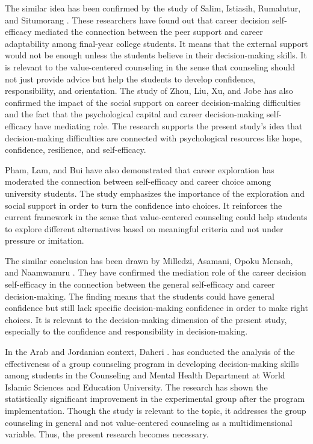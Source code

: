 \documentclass[10pt]{NSP1}
\begin{document}
The similar idea has been confirmed by the study of Salim, Istiasih, Rumalutur, and Situmorang \cite{ref30} . These researchers have found out that career decision self-efficacy mediated the connection between the peer support and career adaptability among final-year college students. It means that the external support would not be enough unless the students believe in their decision-making skills. It is relevant to the value-centered counseling in the sense that counseling should not just provide advice but help the students to develop confidence, responsibility, and orientation. The study of Zhou, Liu, Xu, and Jobe \cite{ref31} has also confirmed the impact of the social support on career decision-making difficulties and the fact that the psychological capital and career decision-making self-efficacy have mediating role. The research supports the present study's idea that decision-making difficulties are connected with psychological resources like hope, confidence, resilience, and self-efficacy.

Pham, Lam, and Bui \cite{ref32} have also demonstrated that career exploration has moderated the connection between self-efficacy and career choice among university students. The study emphasizes the importance of the exploration and social support in order to turn the confidence into choices. It reinforces the current framework in the sense that value-centered counseling could help students to explore different alternatives based on meaningful criteria and not under pressure or imitation.

The similar conclusion has been drawn by Milledzi, Asamani, Opoku Mensah, and Naamwanuru \cite{ref33}. They have confirmed the mediation role of the career decision self-efficacy in the connection between the general self-efficacy and career decision-making. The finding means that the students could have general confidence but still lack specific decision-making confidence in order to make right choices. It is relevant to the decision-making dimension of the present study, especially to the confidence and responsibility in decision-making.

In the Arab and Jordanian context, Daheri \cite{ref34}. has conducted the analysis of the effectiveness of a group counseling program in developing decision-making skills among students in the Counseling and Mental Health Department at World Islamic Sciences and Education University. \cite{ref38} The research has shown the statistically significant improvement in the experimental group after the program implementation. Though the study is relevant to the topic, it addresses the group counseling in general and not value-centered counseling as a multidimensional variable. Thus, the present research becomes necessary.
\end{document}
